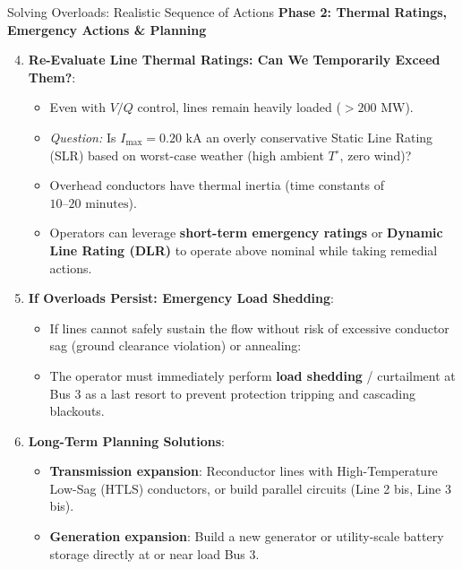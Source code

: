 \begin{frame}[allowframebreaks]{Solving Overloads: Realistic Sequence of Actions}
    \newpage
    \textbf{Phase 2: Thermal Ratings, Emergency Actions \& Planning}
    \begin{enumerate}
        \setcounter{enumi}{3}
        \item \textbf{Re-Evaluate Line Thermal Ratings: Can We Temporarily Exceed Them?}:
        \begin{itemize}
            \item Even with $V/Q$ control, lines remain heavily loaded ($>200\text{ MW}$).
            \item \textit{Question:} Is $I_{\max} = 0.20\text{ kA}$ an overly conservative Static Line Rating (SLR) based on worst-case weather (high ambient $T^\circ$, zero wind)?
            \item Overhead conductors have thermal inertia (time constants of $10\text{--}20\text{ minutes}$).
            \item Operators can leverage \textbf{short-term emergency ratings} or \textbf{Dynamic Line Rating (DLR)} to operate above nominal while taking remedial actions.
        \end{itemize}
        \vspace{0.1cm}
        \item \textbf{If Overloads Persist: Emergency Load Shedding}:
        \begin{itemize}
            \item If lines cannot safely sustain the flow without risk of excessive conductor sag (ground clearance violation) or annealing:
            \item The operator must immediately perform \textbf{load shedding} / curtailment at Bus 3 as a last resort to prevent protection tripping and cascading blackouts.
        \end{itemize}
        \vspace{0.1cm}
        \item \textbf{Long-Term Planning Solutions}:
        \begin{itemize}
            \item \textbf{Transmission expansion}: Reconductor lines with High-Temperature Low-Sag (HTLS) conductors, or build parallel circuits (Line 2 bis, Line 3 bis).
            \item \textbf{Generation expansion}: Build a new generator or utility-scale battery storage directly at or near load Bus 3.
        \end{itemize}
    \end{enumerate}
\end{frame}


